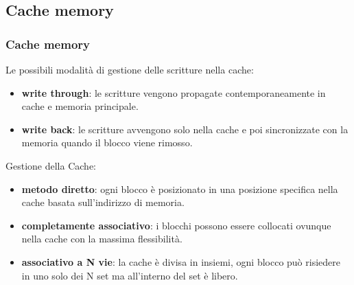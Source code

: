 \subsection[Cache memory]{Cache memory}
\begin{frame}
	\frametitle{ Cache memory}
	
	\begin{block}{Le possibili modalità di gestione delle scritture nella cache:}
		\begin{itemize}
			\item \textbf{write through}: le scritture vengono propagate contemporaneamente in cache e memoria principale.
			\item \textbf{write back}: le scritture avvengono solo nella cache e poi sincronizzate con la memoria quando il blocco viene rimosso.
		\end{itemize}
		
	\end{block}


	\begin{block}{Gestione della Cache:}
		\begin{itemize}
			\item \textbf{metodo diretto}: ogni blocco è posizionato in una posizione specifica nella cache basata sull'indirizzo di memoria.
			\item \textbf{completamente associativo}: i blocchi possono essere collocati ovunque nella cache con la massima flessibilità.
			\item \textbf{associativo a N vie}: la cache è divisa in insiemi, ogni blocco può risiedere in uno solo dei N set ma all'interno del set è libero.%
		\end{itemize}
		
	\end{block}
	
	
\end{frame}




